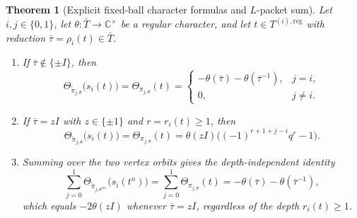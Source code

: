 \documentclass[12pt, letterpaper]{article}
\numberwithin{equation}{section}
\newtheorem{theorem}{Theorem}[section]
\theoremstyle{definition}
\theoremstyle{remark}
\begin{document}
\begin{theorem}[Explicit fixed-ball character formulas and $L$-packet sum]\label{thm:explicit}
Let $i,j\in\{0,1\}$, let $\theta:\bar{T}\to\mathbb{C}^\times$ be a regular character, and let $t\in T^{(i),\mathrm{reg}}$ with reduction $\bar{\tau}=\rho_i(t)\in\bar{T}$.
\begin{enumerate}[label=(\roman*)]
 \item If $\bar{\tau}\notin\{\pm I\}$, then
 \begin{equation}\label{eq:explicit-far}
  \Theta_{\widetilde{\pi}_{j,\theta}}\bigl(s_i(t)\bigr)=\Theta_{\pi_{j,\theta}}(t)=
  \begin{cases}
   -\theta(\bar{\tau})-\theta(\bar{\tau}^{-1}), & j=i,\\
   0, & j\ne i.
  \end{cases}
 \end{equation}
 \item If $\bar{\tau}=zI$ with $z\in\{\pm 1\}$ and $r=r_i(t)\ge 1$, then
 \begin{equation}\label{eq:explicit-near}
  \Theta_{\widetilde{\pi}_{j,\theta}}\bigl(s_i(t)\bigr)=\Theta_{\pi_{j,\theta}}(t)
  =\theta(zI)\bigl((-1)^{r+1+j-i}q^r-1\bigr).
 \end{equation}
 \item Summing over the two vertex orbits gives the depth-independent identity
 \begin{equation}\label{eq:packet-sum}
  \sum_{j=0}^1\Theta_{\widetilde{\pi}_{j,\theta^{\langle n\rangle}}}\bigl(s_i(t^n)\bigr)
  =\sum_{j=0}^1\Theta_{\pi_{j,\theta}}(t)
  =-\theta(\bar{\tau})-\theta(\bar{\tau}^{-1}),
 \end{equation}
 which equals $-2\theta(zI)$ whenever $\bar{\tau}=zI$, regardless of the depth $r_i(t)\ge 1$.
\end{enumerate}
\end{theorem}
\end{document}
